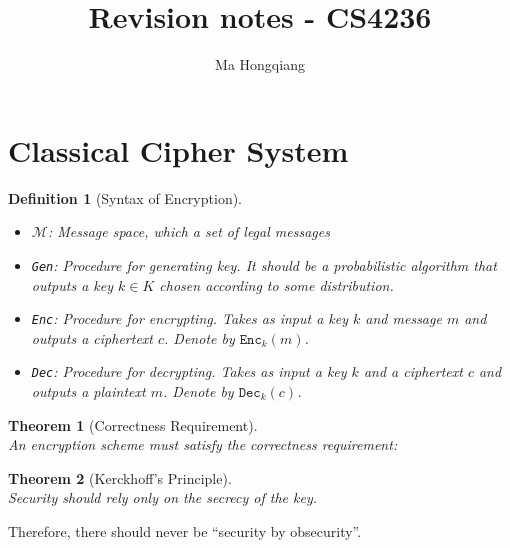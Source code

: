 \documentclass[12pt]{article}
\newtheorem{definition}{Definition}[section]
\newtheorem{theorem}{Theorem}[section]
\theoremstyle{definition}
\begin{document}
\title{Revision notes - CS4236}
\author{Ma Hongqiang}
\maketitle
\tableofcontents


\twocolumn
\section{Classical Cipher System}
\begin{definition}[Syntax of Encryption]
\hfill\\\normalfont 
\begin{itemize}
\item $\mathcal{M}$: Message space, which a set of legal messages
\item \texttt{Gen}: Procedure for generating key. It should be a probabilistic algorithm that outputs a key $k\in K$ chosen according to some distribution.
\item \texttt{Enc}: Procedure for encrypting. Takes as input a key $k$ and message $m$ and outputs a ciphertext $c$. Denote by $\texttt{Enc}_k(m)$.
\item \texttt{Dec}: Procedure for decrypting. Takes as input a key $k$ and a ciphertext $c$ and outputs a plaintext $m$. Denote by $\texttt{Dec}_k(c)$.
\end{itemize}
\end{definition}
\begin{theorem}[Correctness Requirement]
\hfill\\\normalfont An encryption scheme must satisfy the correctness requirement: \\
\end{theorem}
\begin{theorem}[Kerckhoff's Principle]
\hfill\\\normalfont Security should rely \textit{only} on the secrecy of the key.
\end{theorem}
Therefore, there should never be ``security by obsecurity''.
\end{document}
